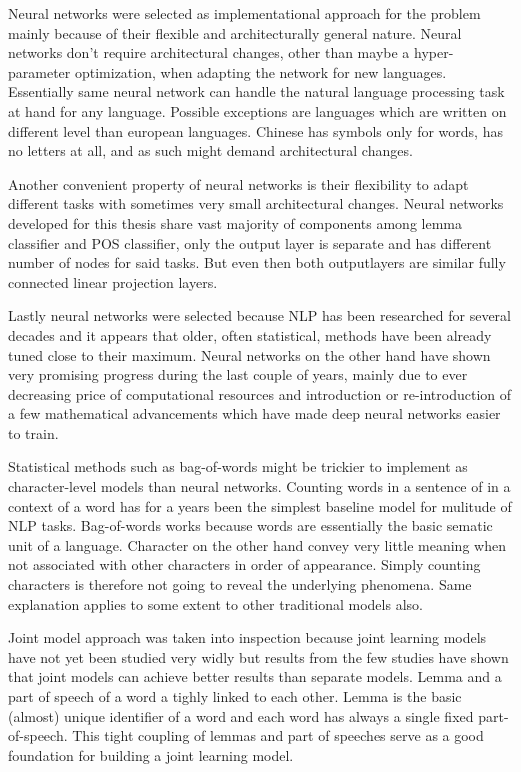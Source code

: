 \documentclass[12pt,a4paper,english
]{tutthesis}
\begin{document}
Neural networks were selected as implementational approach for the problem mainly because of their flexible and architecturally general nature. Neural networks don't require architectural changes, other than maybe a hyper-parameter optimization, when adapting the network for new languages. Essentially same neural network can handle the natural language processing task at hand for any language. Possible exceptions are languages which are written on different level than european languages. Chinese has symbols only for words, has no letters at all, and as such might demand architectural changes.

Another convenient property of neural networks is their flexibility to adapt different tasks with sometimes very small architectural changes. Neural networks developed for this thesis share vast majority of components among lemma classifier and POS classifier, only the output layer is separate and has different number of nodes for said tasks. But even then both outputlayers are similar fully connected linear projection layers.

Lastly neural networks were selected because NLP has been researched for several decades and it appears that older, often statistical, methods have been already tuned close to their maximum. Neural networks on the other hand have shown very promising progress during the last couple of years, mainly due to ever decreasing price of computational resources and introduction or re-introduction of a few mathematical advancements which have made deep neural networks easier to train. 

Statistical methods such as bag-of-words might be trickier to implement as character-level models than neural networks. Counting words in a sentence of in a context of a word has for a years been the simplest baseline model for mulitude of NLP tasks. Bag-of-words works because words are essentially the basic sematic unit of a language. Character on the other hand convey very little meaning when not associated with other characters in order of appearance. Simply counting characters is therefore not going to reveal the underlying phenomena. Same explanation applies to some extent to other traditional models also.

Joint model approach was taken into inspection because joint learning models have not yet been studied very widly but results from the few studies have shown that joint models can achieve better results than separate models. Lemma and a part of speech of a word a tighly linked to each other. Lemma is the basic (almost) unique identifier of a word and each word has always a single fixed part-of-speech. This tight coupling of lemmas and part of speeches serve as a good foundation for building a joint learning model. 
\end{document}
